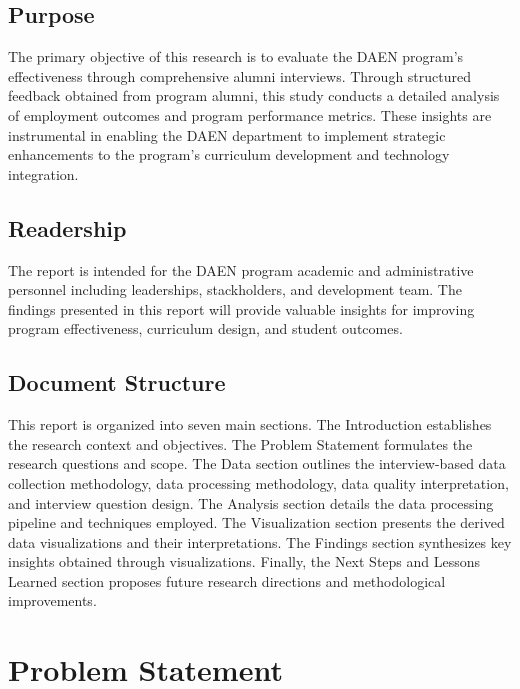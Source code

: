 \documentclass[12pt,a4paper]{article}
\begin{document}
\subsection{Purpose}
The primary objective of this research is to evaluate the DAEN 
program's effectiveness through comprehensive alumni interviews. Through structured feedback 
obtained from program alumni, this study conducts a 
detailed analysis of employment outcomes and program performance 
metrics. These insights are instrumental in enabling the DAEN 
department to implement strategic enhancements to the program's curriculum development and technology integration.

\subsection{Readership}
The report is intended for the DAEN program academic and 
administrative personnel including leaderships, stackholders, 
and development team. The findings presented in this report will provide valuable insights for improving program effectiveness, curriculum design, and student outcomes.

\subsection{Document Structure}
This report is organized into seven main sections. The Introduction 
establishes the research context and objectives. The Problem 
Statement formulates the research questions and scope. 
The Data section outlines the interview-based data collection 
methodology, data processing methodology, data quality interpretation, and interview question design. The Analysis section details the data 
processing pipeline and techniques employed. The Visualization section presents the derived data visualizations 
and their interpretations. The Findings section synthesizes key 
insights obtained through visualizations. Finally, the Next 
Steps and Lessons Learned section proposes future research 
directions and methodological improvements.

\newpage

\section{Problem Statement}
\end{document}
